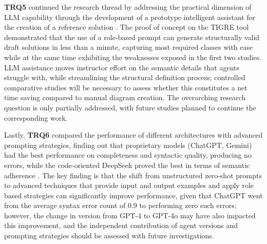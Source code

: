\textbf{TRQ5} continued the research thread by addressing the practical dimension of LLM capability through the development of a prototype intelligent assistant for the creation of a reference solution \cite{garaccione2026automated}. The proof of concept on the TIGRE tool demonstrated that the use of a role-based prompt can generate structurally valid draft solutions in less than a minute, capturing most required classes with ease while at the same time exhibiting the weaknesses exposed in the first two studies. LLM assistance moves instructor effort on the semantic details that agents struggle with, while streamlining the structural definition process; controlled comparative studies will be necessary to assess whether this constitutes a net time saving compared to manual diagram creation. The overarching research question is only partially addressed, with future studies planned to continue the corresponding work.

Lastly, \textbf{TRQ6} compared the performance of different architectures with advanced prompting strategies, finding out that proprietary models (ChatGPT, Gemini) had the best performance on completeness and syntactic quality, producing no errors, while the code-oriented DeepSeek proved the best in terms of semantic adherence \cite{garaccione2025models}. The key finding is that the shift from unstructured zero-shot prompts to advanced techniques that provide input and output examples and apply role based strategies can significantly improve performance, given that ChatGPT went from the average syntax error count of 0.9 to performing zero such errors; however, the change in version from GPT-4 to GPT-4o may have also impacted this improvement, and the independent contribution of agent versions and prompting strategies should be assessed with future investigations.

